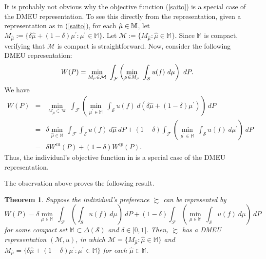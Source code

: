 \documentclass[12pt, notitlepage]{article}
\newtheorem{theorem}{Theorem}
\begin{document}
It is probably not obvious why the objective function (\ref{saito}) is a
special case of the DMEU representation. To see this directly from the
representation, given a representation as in (\ref{saito}), for each $\hat{%
\mu}\in \mathbb{M}$, let $M_{\hat{\mu}}:=\{\delta \hat{\mu}+(1-\delta )\mu
^{\prime }:\mu ^{\prime }\in \mathbb{M}\}$. Let $\mathcal{M}:=\{M_{\hat{\mu}%
}:\hat{\mu}\in \mathbb{M}\}$. Since $\mathbb{M}$ is compact, verifying that $%
\mathcal{M}$ is compact is straightforward. Now, consider the following DMEU
representation:%
\begin{equation*}
W(P)=\min_{M_{\hat{\mu}}\in \mathcal{M}}~\int_{\mathcal{F}}\left( \underset{%
\mu \in M_{\hat{\mu}}}{\min }~\int_{\mathcal{S}}u(f)~d\mu \right) ~dP.
\end{equation*}%
We have%
\begin{eqnarray*}
W(P) &=&\min_{M_{\hat{\mu}}\in \mathcal{M}}~\int_{\mathcal{F}}\left( 
\underset{\mu ^{\prime }\in \mathbb{M}}{\min }~\int_{\mathcal{S}%
}u(f)~d(\delta \hat{\mu}+(1-\delta )\mu ^{\prime })\right) ~dP \\
&=&\delta \min_{\hat{\mu}\in \mathbb{M}}~\int_{\mathcal{F}}\int_{\mathcal{S}%
}u(f)~d\hat{\mu}~dP+(1-\delta )\int_{\mathcal{F}}\left( \underset{\mu
^{\prime }\in \mathbb{M}}{\min }~\int_{\mathcal{S}}u(f)~d\mu ^{\prime
}\right) ~dP \\
&=&\delta W^{ea}(P)+(1-\delta )W^{ep}(P).
\end{eqnarray*}%
Thus, the individual's objective function in \cite{Saito15} is a special
case of the DMEU representation.

The observation above proves the following result.

\begin{theorem}
Suppose the individual's preference $\succsim $ can be represented by%
\begin{equation*}
W(P)=\delta \underset{\mu \in \mathbb{M}}{\min }~\int_{\mathcal{F}}\left(
\int_{\mathcal{S}}u(f)~d\mu \right) ~dP+(1-\delta )\int_{\mathcal{F}}\left( 
\underset{\mu \in \mathbb{M}}{\min }~\int_{\mathcal{S}}u(f)~d\mu \right) ~dP
\end{equation*}%
for some compact set $\mathbb{M}\subset \Delta (\mathcal{S})$ and $\delta
\in \lbrack 0,1]$. Then, $\succsim $ has a DMEU representation $(\mathcal{M}%
,u)$, in which $\mathcal{M}=\{M_{\hat{\mu}}:\hat{\mu}\in \mathbb{M}\}$ and $%
M_{\hat{\mu}}=\{\delta \hat{\mu}+(1-\delta )\mu ^{\prime }:\mu ^{\prime }\in 
\mathbb{M}\}$ for each $\hat{\mu}\in \mathbb{M}$.
\end{theorem}
\end{document}
